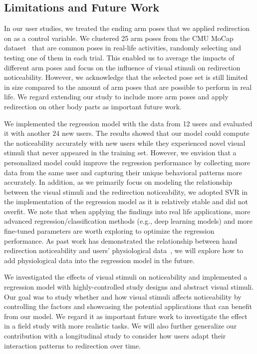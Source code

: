 \subsection{Limitations and Future Work}

In our user studies, we treated the ending arm poses that we applied redirection on as a control variable.
We clustered 25 arm poses from the CMU MoCap dataset~\cite{CMUMocap} that are common poses in real-life activities, randomly selecting and testing one of them in each trial.
This enabled us to average the impacts of different arm poses and focus on the influence of visual stimuli on redirection noticeability.
However, we acknowledge that the selected pose set is still limited in size compared to the amount of arm poses that are possible to perform in real life.
We regard extending our study to include more arm poses and apply redirection on other body parts as important future work.

We implemented the regression model with the data from 12 users and evaluated it with another 24 new users.
The results showed that our model could compute the noticeability accurately with new users while they experienced novel visual stimuli that never appeared in the training set.
However, we envision that a personalized model could improve the regression performance by collecting more data from the same user and capturing their unique behavioral patterns more accurately.
In addition, as we primarily focus on modeling the relationship between the visual stimuli and the redirection noticeability, we adopted SVR in the implementation of the regression model as it is relatively stable and did not overfit.
We note that when applying the findings into real life applications, more advanced regression/classification methods (e.g., deep learning models) and more fine-tuned parameters are worth exploring to optimize the regression performance.
As past work has demonstrated the relationship between hand redirection noticeability and users' physiological data~\cite{feick2023investigating}, we will explore how to add physiological data into the regression model in the future.

We investigated the effects of visual stimuli on noticeability and implemented a regression model with highly-controlled study designs and abstract visual stimuli.
Our goal was to study whether and how visual stimuli affects noticeability by controlling the factors and showcasing the potential applications that can benefit from our model.
We regard it as important future work to investigate the effect in a field study with more realistic tasks.
We will also further generalize our contribution with a longitudinal study to consider how users adapt their interaction patterns to redirection over time.


